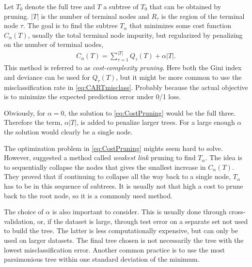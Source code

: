 Let $T_0$ denote the full tree and $T$ a subtree of $T_0$ that can be obtained by pruning. $|T|$ is the number of terminal nodes and $R_{\tau}$ is the region of the terminal node $\tau$. The goal is to find the subtree $T_\alpha$ that minimizes some cost function $C_\alpha (T)$, usually the total terminal node impurity, but regularized by penalizing on the number of terminal nodes,
\begin{align}
  \label{eq:CostPruning} 
  C_\alpha (T) = \sum_{\tau = 1}^{|T|} Q_\tau (T) + \alpha |T|. 
\end{align}
This method is referred to as \textit{cost-complexity pruning}.
Here both the Gini index and deviance can be used for $Q_\tau (T)$, but it might be more common to use the misclassification rate in \eqref{eq:CARTmisclass}. Probably because the actual objective is to minimize the expected prediction error under 0/1 loss. 

Obviously, for $\alpha = 0$, the solution to \eqref{eq:CostPruning} would be the full three. Therefore the term, $\alpha |T|$, is added to penalize larger trees. For a large enough $\alpha$ the solution would clearly be a single node.

The optimization problem in \eqref{eq:CostPruning} mights seem hard to solve. However, \cite{breiman} suggested a method called \textit{weakest link} pruning to find $T_\alpha$. The idea is to sequentially collapse the nodes that gives the smallest increase in $C_\alpha(T)$.
They proved that if continuing to collapse all the way back to a single node, $T_\alpha$ has to be in this sequence of subtrees. It is usually not that high a cost to prune back to the root node, so it is a commonly used method.

The choice of $\alpha$ is also important to consider. This is usually done through cross-validation, or, if the dataset is large, through test error on a separate set not used to build the tree. The latter is less computationally expensive, but can only be used on larger datasets. 
The final tree chosen is not necessarily the tree with the lowest misclassification error. Another common practice is to use the most parsimonious tree within one standard deviation of the minimum.


